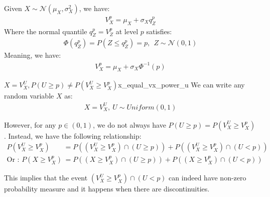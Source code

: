 \begin{proof*}
    
\end{proof*}
    

\begin{definition}
    Given $X\sim \mathcal{N}(\mu_X, \sigma_X^2)$, we have:
    \begin{align*}
        \boxed{
            V_X^p = \mu_X + \sigma_X q_Z^p
        }
    \end{align*}
    \noindent Where the normal quantile $q_Z^p = V_Z^p$ at level $p$ satisfies:
    \begin{align*}
        \Phi(q_Z^p) = P(Z \le q_Z^p) = p, \ \ Z \sim \mathcal{N}(0,1)
    \end{align*}
    \noindent Meaning, we have:
    \begin{align*}
        V_X^p = \mu_X + \sigma_X \Phi^{-1}(p)
    \end{align*}
\end{definition}

\begin{lemma}{$X=V_X^U, P(U \ge p) \ne P(V_X^U \ge V_X^p)$}{x_equal_vx_power_u}
    We can write any random variable $X$ as:
    \begin{align*}
        X = V_X^U, \ U \sim Uniform(0,1)
    \end{align*}

    \noindent However, for any $p\in(0,1)$, we do not always have $P(U \ge p) = P(V_X^U \ge V_X^p)$. Instead, we have the following relationship:
    \begin{align*}
        P(V_X^U \ge V_X^p) &= P((V_X^U \ge V_X^p) \cap (U \ge p)) + P((V_X^U \ge V_X^p) \cap (U < p)) \\
        \text{Or : } P(X \ge V_X^p) &= P((X \ge V_X^p) \cap (U \ge p)) + P((X \ge V_X^p) \cap (U < p))
    \end{align*}

    \noindent This implies that the event $(V_X^U \ge V_X^p) \cap (U < p)$ can indeed have non-zero probability measure and it happens when there are discontinuities.
\end{lemma}

